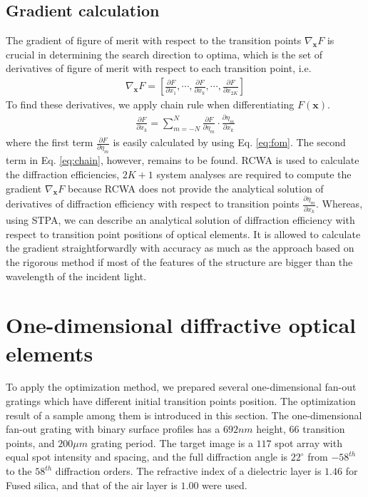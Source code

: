 \subsection{Gradient calculation}
The gradient of figure of merit with respect to the transition points $\nabla_\mathbf{x}F$ is crucial in determining the search direction to optima, which is the set of derivatives of figure of merit with respect to each transition point, i.e.
\begin{align} \label{eq:gradient}
\nabla_\mathbf{x}F=\left[\frac{\partial F}{{\partial x_1}},\cdots,\frac{\partial F}{{\partial  x_k}},\cdots,\frac{\partial F}{{\partial x_{2K}}}\right]
\end{align}
To find these derivatives, we apply chain rule when differentiating $F(\mathbf{x})$. 
\begin{align}\label{eq:chain}
\frac{\partial F}{\partial  x_k} = \sum_{m=-N}^{N} \frac{\partial F}{\partial \eta_m} \cdot \frac{\partial \eta_m}{\partial  x_k} 
\end{align}
where the first term $\frac{\partial F}{\partial \eta_m}$ is easily calculated by using Eq. \ref{eq:fom}. The second term in Eq. \ref{eq:chain}, however, remains to be found.
RCWA is used to calculate the diffraction efficiencies, $2K+1$ system analyses are required to compute the gradient $\nabla_\mathbf{x}F$ because RCWA does not provide the analytical solution of derivatives of diffraction efficiency with respect to transition points $\frac{\partial \eta_m}{\partial x_k}$.
Whereas, using STPA, we can describe an analytical solution of diffraction efficiency with respect to transition point positions of optical elements.
It is allowed to calculate the gradient straightforwardly with accuracy as much as the approach based on the rigorous method if most of the features of the structure are bigger than the wavelength of the incident light.

\section{One-dimensional diffractive optical elements}
To apply the optimization method, we prepared several one-dimensional fan-out gratings which have different initial transition points position.
The optimization result of a sample among them is introduced in this section. 
The one-dimensional fan-out grating with binary surface profiles has a $692 nm$ height, $66$ transition points, and $200 \mu m$ grating period. 
The target image is a $117$ spot array with equal spot intensity and spacing, and the full diffraction angle is $22^{\circ}$ from $-58^{th}$ to the $58^{th}$ diffraction orders.
The refractive index of a dielectric layer is $1.46$ for Fused silica, and that of the air layer is $1.00$ were used.

